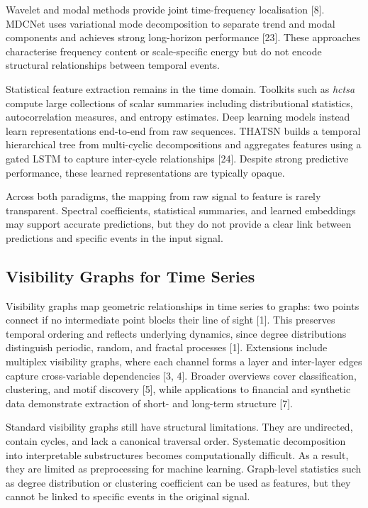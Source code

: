 \documentclass[a4paper,12pt]{article}
\begin{document}
Wavelet and modal methods provide joint time-frequency localisation [8]. MDCNet uses variational mode decomposition to separate trend and modal components and achieves strong long-horizon performance [23]. These approaches characterise frequency content or scale-specific energy but do not encode structural relationships between temporal events.

Statistical feature extraction remains in the time domain. Toolkits such as \textit{hctsa} compute large collections of scalar summaries including distributional statistics, autocorrelation measures, and entropy estimates. Deep learning models instead learn representations end-to-end from raw sequences. THATSN builds a temporal hierarchical tree from multi-cyclic decompositions and aggregates features using a gated LSTM to capture inter-cycle relationships [24]. Despite strong predictive performance, these learned representations are typically opaque.

Across both paradigms, the mapping from raw signal to feature is rarely transparent. Spectral coefficients, statistical summaries, and learned embeddings may support accurate predictions, but they do not provide a clear link between predictions and specific events in the input signal.

\subsection{Visibility Graphs for Time Series}
\label{sec:lit-visibility-graphs}

Visibility graphs map geometric relationships in time series to graphs: two points connect if no intermediate point blocks their line of sight [1]. This preserves temporal ordering and reflects underlying dynamics, since degree distributions distinguish periodic, random, and fractal processes [1]. Extensions include multiplex visibility graphs, where each channel forms a layer and inter-layer edges capture cross-variable dependencies [3, 4]. Broader overviews cover classification, clustering, and motif discovery [5], while applications to financial and synthetic data demonstrate extraction of short- and long-term structure [7].

Standard visibility graphs still have structural limitations. They are undirected, contain cycles, and lack a canonical traversal order. Systematic decomposition into interpretable substructures becomes computationally difficult. As a result, they are limited as preprocessing for machine learning. Graph-level statistics such as degree distribution or clustering coefficient can be used as features, but they cannot be linked to specific events in the original signal.
\end{document}
